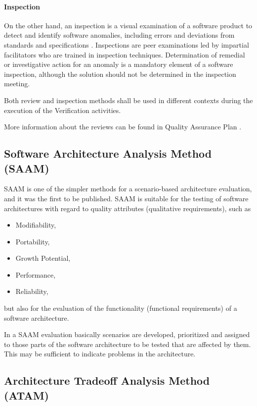 \documentclass{template/openetcs_report}
\begin{document}
\paragraph{Inspection}
On the other hand, an inspection is a visual examination of a software
product to detect and identify software anomalies, including errors
and deviations from standards and specifications
\cite{Fag76-99}. Inspections are peer examinations led by impartial
facilitators who are trained in inspection techniques. Determination
of remedial or investigative action for an anomaly is a mandatory
element of a software inspection, although the solution should not be
determined in the inspection meeting.

Both review and inspection methods shall be used in different
contexts during the execution of the Verification activities.

More information about the reviews can be found in Quality Assurance Plan
\cite{QAplan}.

\subsection{Software Architecture Analysis Method (SAAM)}

SAAM \cite{KABC96} is one of the simpler methods for a scenario-based architecture 
evaluation, and it was the first to be published. SAAM is suitable 
for the testing of software architectures with regard to quality 
attributes (qualitative requirements), such as
%
\begin{itemize}
\item Modifiability,
\item Portability,
\item Growth Potential,
\item Performance,
\item Reliability,
\end{itemize}
%
but also for the evaluation of the functionality (functional 
requirements) of a software architecture. 

In a SAAM evaluation basically scenarios are developed, 
prioritized and assigned to those parts of the software 
architecture to be tested that are affected by them. 
This may be sufficient to indicate problems in the architecture.

\subsection{Architecture Tradeoff Analysis Method (ATAM)}	
\label{sec:atam}
\end{document}

